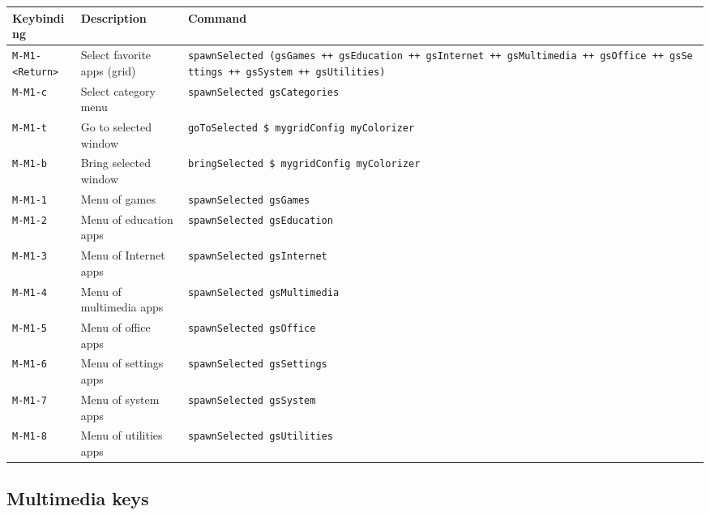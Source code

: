 \begin{longtable}[]{@{}
  >{\raggedright\arraybackslash}p{}
  >{\raggedright\arraybackslash}p{}
  >{\raggedright\arraybackslash}p{}@{}}
\toprule
Keybinding & Description & Command \\
\midrule
\endhead
\texttt{M-M1-\textless{}Return\textgreater{}} & Select favorite apps
(grid) &
\texttt{spawnSelected\textquotesingle{}\ (gsGames\ ++\ gsEducation\ ++\ gsInternet\ ++\ gsMultimedia\ ++\ gsOffice\ ++\ gsSettings\ ++\ gsSystem\ ++\ gsUtilities)} \\
\texttt{M-M1-c} & Select category menu &
\texttt{spawnSelected\textquotesingle{}\ gsCategories} \\
\texttt{M-M1-t} & Go to selected window &
\texttt{goToSelected\ \$\ mygridConfig\ myColorizer} \\
\texttt{M-M1-b} & Bring selected window &
\texttt{bringSelected\ \$\ mygridConfig\ myColorizer} \\
\texttt{M-M1-1} & Menu of games &
\texttt{spawnSelected\textquotesingle{}\ gsGames} \\
\texttt{M-M1-2} & Menu of education apps &
\texttt{spawnSelected\textquotesingle{}\ gsEducation} \\
\texttt{M-M1-3} & Menu of Internet apps &
\texttt{spawnSelected\textquotesingle{}\ gsInternet} \\
\texttt{M-M1-4} & Menu of multimedia apps &
\texttt{spawnSelected\textquotesingle{}\ gsMultimedia} \\
\texttt{M-M1-5} & Menu of office apps &
\texttt{spawnSelected\textquotesingle{}\ gsOffice} \\
\texttt{M-M1-6} & Menu of settings apps &
\texttt{spawnSelected\textquotesingle{}\ gsSettings} \\
\texttt{M-M1-7} & Menu of system apps &
\texttt{spawnSelected\textquotesingle{}\ gsSystem} \\
\texttt{M-M1-8} & Menu of utilities apps &
\texttt{spawnSelected\textquotesingle{}\ gsUtilities} \\
\bottomrule
\end{longtable}

\hypertarget{multimedia-keys}{%
\subsection{Multimedia keys}\label{multimedia-keys}}

